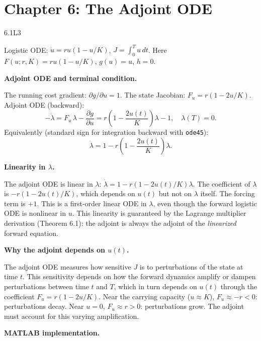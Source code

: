 
\section{Chapter 6: The Adjoint ODE}

\begin{solution}{6.1}{L3}

\solanswer

Logistic ODE: $\dot{u} = ru(1-u/K)$, $J = \int_0^T u\,dt$.
Here $F(u;r,K) = ru(1-u/K)$, $g(u) = u$, $h = 0$.

 \textbf{Adjoint ODE and terminal condition.}

The running cost gradient: $\partial g/\partial u = 1$.
The state Jacobian: $F_u = r(1 - 2u/K)$.
Adjoint ODE (backward):
\[
  -\dot{\lambda} = F_u\,\lambda - \frac{\partial g}{\partial u}
  = r\!\left(1 - \frac{2u(t)}{K}\right)\lambda - 1,
  \quad \lambda(T) = 0.
\]
Equivalently (standard sign for integration backward with \texttt{ode45}):
\[
  \dot{\lambda} = 1 - r\!\left(1 - \frac{2u(t)}{K}\right)\lambda.
\]

 \textbf{Linearity in $\lambda$.}

The adjoint ODE is linear in $\lambda$: $\dot{\lambda} = 1 - r(1-2u(t)/K)\lambda$.
The coefficient of $\lambda$ is $-r(1-2u(t)/K)$, which depends on $u(t)$
but not on $\lambda$ itself. The forcing term is $+1$. This is a
first-order linear ODE in $\lambda$, even though the forward logistic
ODE is nonlinear in $u$. This linearity is guaranteed by the Lagrange
multiplier derivation (Theorem 6.1): the adjoint is always the adjoint
of the \emph{linearized} forward equation.

 \textbf{Why the adjoint depends on $u(t)$.}

The adjoint ODE measures how sensitive $J$ is to perturbations of the
state at time $t$. This sensitivity depends on how the forward dynamics
amplify or dampen perturbations between time $t$ and $T$, which in turn
depends on $u(t)$ through the coefficient $F_u = r(1-2u/K)$. Near the
carrying capacity ($u \approx K$), $F_u \approx -r < 0$: perturbations
decay. Near $u = 0$, $F_u \approx r > 0$: perturbations grow.
The adjoint must account for this varying amplification.

 \textbf{MATLAB implementation.}


\end{solution}
